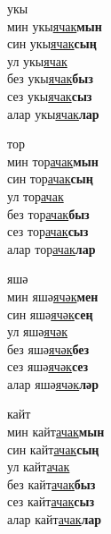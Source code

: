 \begin{multicols}{4}
\begin{enumerate}
\begin{minipage}{\linewidth}
    \item
    укы\\
    мин укы\underline{ячак}\textbf{мын}\\
    син укы\underline{ячак}\textbf{сың}\\
    ул укы\underline{ячак}\\
    без укы\underline{ячак}\textbf{быз}\\
    сез укы\underline{ячак}\textbf{сыз}\\
    алар укы\underline{ячак}\textbf{лар}\\
\end{minipage}

\begin{minipage}{\linewidth}
    \item
    тор\\
    мин тор\underline{ачак}\textbf{мын}\\
    син тор\underline{ачак}\textbf{сың}\\
    ул тор\underline{ачак}\\
    без тор\underline{ачак}\textbf{быз}\\
    сез тор\underline{ачак}\textbf{сыз}\\
    алар тор\underline{ачак}\textbf{лар}\\
\end{minipage}

\begin{minipage}{\linewidth}
    \item
    яшә\\
    мин яшә\underline{ячәк}\textbf{мен}\\
    син яшә\underline{ячәк}\textbf{сең}\\
    ул яшә\underline{ячәк}\\
    без яшә\underline{ячәк}\textbf{без}\\
    сез яшә\underline{ячәк}\textbf{сез}\\
    алар яшә\underline{ячәк}\textbf{ләр}\\
\end{minipage}

\begin{minipage}{\linewidth}
    \item
    кайт\\
    мин кайт\underline{ачак}\textbf{мын}\\
    син кайт\underline{ачак}\textbf{сың}\\
    ул кайт\underline{ачак}\\
    без кайт\underline{ачак}\textbf{быз}\\
    сез кайт\underline{ачак}\textbf{сыз}\\
    алар кайт\underline{ачак}\textbf{лар}\\
\end{minipage}


\end{enumerate}
\end{multicols}
